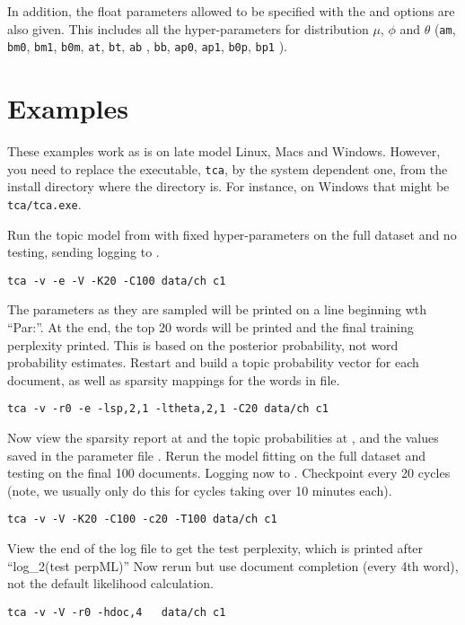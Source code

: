 \documentclass[a4paper,english]{article}
\begin{document}
In addition, the float parameters allowed to be specified with the
 and  options are also given. This includes all the hyper-parameters for distribution $\mu$, $\phi$ and $\theta$ (\texttt{am}, \texttt{bm0}, \texttt{bm1}, \texttt{b0m}, \texttt{at}, \texttt{bt}, \texttt{ab} , \texttt{bb}, \texttt{ap0}, \texttt{ap1}, \texttt{b0p}, \texttt{bp1} ).


\section{Examples}

These examples work as is on late model Linux, Macs and Windows.
However, you need to replace the executable,
\texttt{tca}, by the system dependent one,
from the install directory where the  directory is.
For instance, on Windows that might be \texttt{tca/tca.exe}.

Run the topic model from \citet{dtmpypwl} with fixed hyper-parameters on the full dataset and no testing,
sending logging to .
\begin{verbatim}
tca -v -e -V -K20 -C100 data/ch c1
\end{verbatim}
The parameters as they are sampled will be
printed on a line beginning wth ``Par:''.
At the end, the top 20 words will be printed and the
final training perplexity printed.  This is based on
the posterior probability, not word probability
estimates.
Restart and build a topic probability vector for each document,
as well as sparsity mappings for the words in 
 file.
\begin{verbatim}
tca -v -r0 -e -lsp,2,1 -ltheta,2,1 -C20 data/ch c1
\end{verbatim} 

Now view the sparsity report at  and
the topic probabilities at ,
and the values saved in the parameter file . 
Rerun the model fitting on the full dataset and testing
on the final 100 documents.  Logging now to .
Checkpoint every 20 cycles
(note, we usually only do this for cycles taking over 10 minutes each).

\begin{verbatim}
tca -v -V -K20 -C100 -c20 -T100 data/ch c1
\end{verbatim}

View the end of the log file to get the test perplexity,
which is printed after ``log\_2(test perpML)''
Now rerun but use document completion (every 4th word), not the default
likelihood calculation.
\begin{verbatim}
tca -v -V -r0 -hdoc,4   data/ch c1
\end{verbatim}
\end{document}
